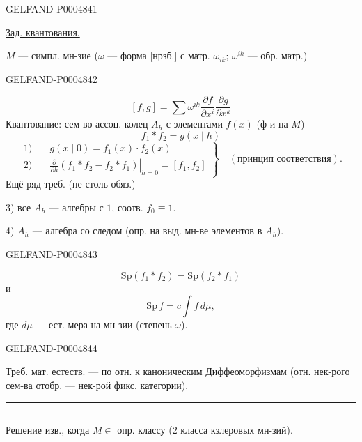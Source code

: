 \begin{GelfandAdjacentEvidence}{GELFAND-P000484}{1}

\uline{Зад. квантования.}

$M$ — симпл. мн-зие
($\omega$ — форма [нрзб.] с матр. $\omega_{ik}$;
$\omega^{ik}$ — обр. матр.)
\end{GelfandAdjacentEvidence}
\begin{GelfandAdjacentEvidence}{GELFAND-P000484}{2}

\[
[f,g]=\sum\omega^{ik}\frac{\partial f}{\partial x^i}
\frac{\partial g}{\partial x^k}
\]
Квантование: сем-во ассоц. колец $A_h$ с элементами $f(x)$ (ф-и на $M$)
\[
f_1\ast f_2=g(x\mid h)
\]
\[
\left.
\begin{aligned}
1)\quad &g(x\mid0)=f_1(x)\cdot f_2(x)\\
2)\quad &\left.\frac{\partial}{\partial h}
(f_1\ast f_2-f_2\ast f_1)\right|_{h=0}=[f_1,f_2]
\end{aligned}
\right\}\quad(\text{принцип соответствия}).
\]
Ещё ряд треб. (не столь обяз.)

3) все $A_h$ — алгебры с $1$, соотв. $f_0\equiv1$.

4) $A_h$ — алгебра со следом (опр. на выд. мн-ве элементов в $A_h$).
\end{GelfandAdjacentEvidence}
\begin{GelfandAdjacentEvidence}{GELFAND-P000484}{3}

\[
\mathrm{Sp}(f_1\ast f_2)=\mathrm{Sp}(f_2\ast f_1)
\]
и
\[
\mathrm{Sp}\, f=c\int f\,d\mu,
\]
где $d\mu$ — ест. мера на мн-зии (степень $\omega$).
\end{GelfandAdjacentEvidence}
\begin{GelfandAdjacentEvidence}{GELFAND-P000484}{4}


Треб. мат. естеств. —  по отн. к каноническим
Диффеоморфизмам (отн. нек-рого сем-ва отобр. — нек-рой фикс. категории).

{\centering\rule{1.9em}{.4pt}\quad\textperiodcentered\quad\rule{1.9em}{.4pt}\par}

Решение изв., когда $M\in$ опр. классу
(2 класса кэлеровых мн-зий).

\begingroup\color{black}\endgroup
{}
\end{GelfandAdjacentEvidence}
